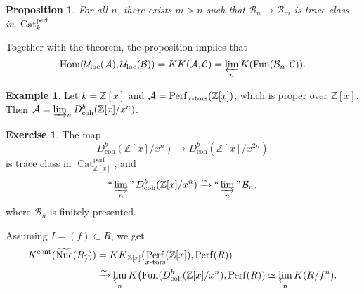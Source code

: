 \documentclass[draft]{amsart}
\newcommand{\ZZ}{\mathbb{Z}}
\newcommand{\wh}[1]{\widehat{#1}}
\newcommand{\wt}[1]{\widetilde{#1}}
\newcommand{\cat}[1]{\mathcal{#1}}
\newcommand{\isoto}{\mathbin{\xrightarrow{\sim}}}
\DeclareMathOperator{\Hom}{Hom}
\DeclareMathOperator{\Nuc}{Nuc}
\DeclareMathOperator{\Cat}{Cat}
\DeclareMathOperator{\Fun}{Fun}
\DeclareMathOperator{\Perf}{Perf}
\DeclareMathOperator*{\indinjlim}{\text{``}\varinjlim\text{''}} %
\newtheorem{prop}[thm]{Proposition}
\theoremstyle{definition}
\newtheorem{ex}[thm]{Example}
\newtheorem{exercise}[thm]{Exercise}
\begin{document}
\begin{prop}
For all $n$, there exists $m>n$ such that $\cat B_n\to \cat B_m$ is trace class in $\Cat^{\mathrm{perf}}_k$.
\end{prop}

Together with the theorem, the proposition implies that
\[
\Hom(\cat U_{\mathrm{loc}}(\cat A), \cat U_{\mathrm{loc}}(\cat B)) = {KK}(\cat A, \cat C) = \varprojlim_n K(\Fun(\cat B_n, \cat C)).
\]

\begin{ex}
Let $k = \ZZ[x]$ and $\cat A = \Perf_{\textnormal{$x$-tors}}(\ZZ[x])$, which is proper over $\ZZ[x]$. Then $\cat A = \varinjlim_n D^b_{\mathrm{coh}}(\ZZ[x]/x^n)$.
\end{ex}

\begin{exercise}
The map
\[
D^b_{\mathrm{coh}}(\ZZ[x]/x^n) \to D^b_{\mathrm{coh}}(\ZZ[x]/x^{2n})
\]
is trace class in $\Cat^{\mathrm{perf}}_{\ZZ[x]}$, and
\[
\indinjlim_n D^b_{\mathrm{coh}}(\ZZ[x]/x^n) \isoto \indinjlim_n \cat B_n,
\]
where $\cat B_n$ is finitely presented.
\end{exercise}

Assuming $I = (f) \subset R$, we get
\begin{align*}
K^{\mathrm{cont}}(\wt{\Nuc}(R_{\wh I})) &= {KK}_{\ZZ[x]}(\Perf_{\textnormal{$x$-tors}}(\ZZ[x]), \Perf(R)) \\
&\isoto \varprojlim_n K\bigl(\Fun(D^b_{\mathrm{coh}}(\ZZ[x]/x^n), \Perf(R)) \simeq \varprojlim_n K(R/f^n).
\end{align*}
\end{document}
